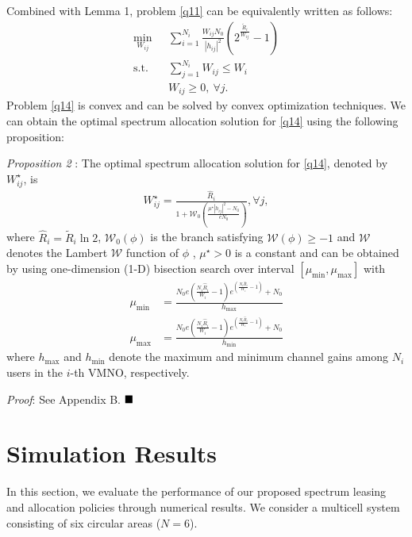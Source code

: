 \documentclass[journal]{IEEEtran}
\begin{document}
Combined with Lemma 1, problem \eqref{q11} can be equivalently written as follows:
\begin{subequations}\label{q14}
	\begin{align}
	\min_{W_{ij}}\ & \sum\limits_{i = 1}^{N_i} \frac{W_{ij}N_0}{\left|h_{ij}\right|^2}\left(2^{\frac{\tilde{R}_i}{W_{ij}}} - 1\right) \label{q14a} \\ \mbox{s.t.} \quad &  \sum\limits_{j = 1}^{N_i} W_{ij} \leq W_i \label{q14b} \\
	& W_{ij} \geq 0, \ \forall j. \label{q14c}
	\end{align}
\end{subequations}
Problem \eqref{q14} is convex and can be solved by convex optimization techniques. We can obtain the optimal spectrum allocation solution for \eqref{q14} using the following proposition:

\textit{Proposition 2} : The optimal spectrum allocation solution for \eqref{q14}, denoted by $W_{ij}^\star$, is
\begin{align}
W_{ij}^\star = \frac{\hat{R}_i}{1 + \mathcal{W}_0\left(\frac{\mu^{\star}\left|h_{ij}\right|^2 - N_0}{eN_0}\right)}, \forall j,
\end{align}
where $\hat{R}_i = \tilde{R}_i\ln2$, $\mathcal{W}_0\left(\phi\right)$ is the branch satisfying $\mathcal{W}\left(\phi\right) \geq -1$ and $\mathcal{W}$ denotes the Lambert $\mathcal{W}$ function of $\phi$ \cite{RMCorless}, $\mu^{\star} > 0$ is a constant and can be obtained by using one-dimension (1-D) bisection search over interval $\left[\mu_{\mbox{min}}, \mu_{\mbox{max}}\right]$ with
\begin{align}
\mu_{\mbox{min}} &= \frac{N_0e\left(\frac{N_i\hat{R}_i}{W_i} - 1\right)e^{\left(\frac{N_i\hat{R}_i}{W_i} - 1\right)} + N_0}{h_{\mbox{max}}}  \\
\mu_{\mbox{max}} & = \frac{N_0e\left(\frac{N_i\hat{R}_i}{W_i} - 1\right)e^{\left(\frac{N_i\hat{R}_i}{W_i} - 1\right)} + N_0}{h_{\mbox{min}}}
\end{align}
where $h_{\mbox{max}}$ and $h_{\mbox{min}}$ denote the maximum and minimum channel gains among $N_i$ users in the $i$-th VMNO, respectively.

\textit{Proof}: See Appendix B.  $\hfill\blacksquare$
\section{Simulation Results}
In this section, we evaluate the performance of our proposed spectrum leasing and allocation policies through numerical results. We consider a multicell system consisting of six circular areas ($N = 6$). 
\end{document}

